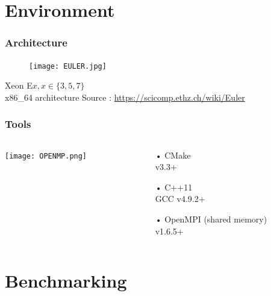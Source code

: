 \documentclass{beamer}
\begin{document}
\section{Environment}
\begin{frame}
\frametitle{Architecture}
\begin{figure}
\texttt{[image: EULER.jpg]}
\end{figure}


\vspace{.5 cm}

Xeon E$x, x\in\{3, 5, 7\}$\\x86\_64 architecture
\vfill
{
\tiny
Source : 
\url{https://scicomp.ethz.ch/wiki/Euler}
}
\end{frame}
\begin{frame}
\frametitle{Tools}
\begin{columns}
\begin{column}{.4\linewidth}
\texttt{[image: OPENMP.png]}
\end{column}

\begin{column}{.6\linewidth}
\begin{itemize}
\item[•] CMake\\\hspace{.5cm}v3.3+
\vspace{.2cm}
\item[•] C++11\\\hspace{.5cm}GCC v4.9.2+
\vspace{.2cm}
\item[•] OpenMPI (shared memory)\\\hspace{.5cm}v1.6.5+
\end{itemize}
\end{column}
\end{columns}

\end{frame}


\section{Benchmarking}
\end{document}
